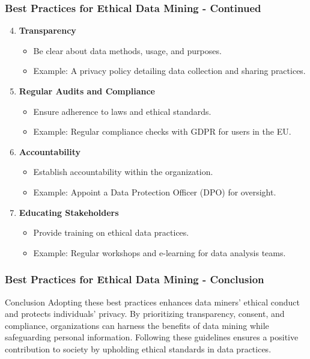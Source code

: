 \documentclass{beamer}
\begin{document}
\begin{frame}[fragile]
    \frametitle{Best Practices for Ethical Data Mining - Continued}
    \begin{enumerate}
        \setcounter{enumi}{3} %
        \item \textbf{Transparency}
        \begin{itemize}
            \item Be clear about data methods, usage, and purposes.
            \item Example: A privacy policy detailing data collection and sharing practices.
        \end{itemize}

        \item \textbf{Regular Audits and Compliance}
        \begin{itemize}
            \item Ensure adherence to laws and ethical standards.
            \item Example: Regular compliance checks with GDPR for users in the EU.
        \end{itemize}

        \item \textbf{Accountability}
        \begin{itemize}
            \item Establish accountability within the organization.
            \item Example: Appoint a Data Protection Officer (DPO) for oversight.
        \end{itemize}

        \item \textbf{Educating Stakeholders}
        \begin{itemize}
            \item Provide training on ethical data practices.
            \item Example: Regular workshops and e-learning for data analysis teams.
        \end{itemize}
    \end{enumerate}
\end{frame}

\begin{frame}[fragile]
    \frametitle{Best Practices for Ethical Data Mining - Conclusion}
    \begin{block}{Conclusion}
        Adopting these best practices enhances data miners' ethical conduct and protects individuals' privacy. By prioritizing transparency, consent, and compliance, organizations can harness the benefits of data mining while safeguarding personal information. Following these guidelines ensures a positive contribution to society by upholding ethical standards in data practices.
    \end{block}
\end{frame}
\end{document}
